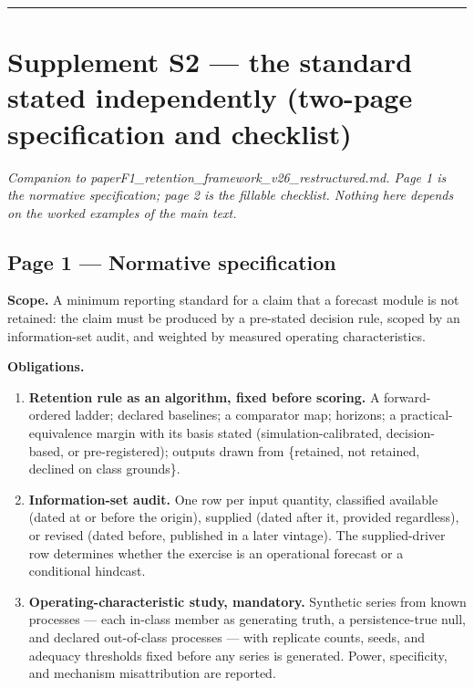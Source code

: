 \documentclass[11pt]{article}
\providecommand{\tightlist}{\setlength{\itemsep}{0.2em}\setlength{\parskip}{0pt}}
\begin{document}
\begin{center}\rule{0.5\linewidth}{0.5pt}\end{center}

\section{Supplement S2 --- the standard stated independently (two-page
specification and
checklist)}\label{supplement-s2-the-standard-stated-independently-two-page-specification-and-checklist}

\emph{Companion to paperF1\_retention\_framework\_v26\_restructured.md.
Page 1 is the normative specification; page 2 is the fillable checklist.
Nothing here depends on the worked examples of the main text.}

\subsection{Page 1 --- Normative
specification}\label{page-1-normative-specification}

\textbf{Scope.} A minimum reporting standard for a claim that a forecast
module is not retained: the claim must be produced by a pre-stated
decision rule, scoped by an information-set audit, and weighted by
measured operating characteristics.

\textbf{Obligations.}

\begin{enumerate}
\def\labelenumi{\arabic{enumi}.}
\tightlist
\item
  \textbf{Retention rule as an algorithm, fixed before scoring.} A
  forward-ordered ladder; declared baselines; a comparator map;
  horizons; a practical-equivalence margin with its basis stated
  (simulation-calibrated, decision-based, or pre-registered); outputs
  drawn from \{retained, not retained, declined on class grounds\}.
\item
  \textbf{Information-set audit.} One row per input quantity, classified
  available (dated at or before the origin), supplied (dated after it,
  provided regardless), or revised (dated before, published in a later
  vintage). The supplied-driver row determines whether the exercise is
  an operational forecast or a conditional hindcast.
\item
  \textbf{Operating-characteristic study, mandatory.} Synthetic series
  from known processes --- each in-class member as generating truth, a
  persistence-true null, and declared out-of-class processes --- with
  replicate counts, seeds, and adequacy thresholds fixed before any
  series is generated. Power, specificity, and mechanism misattribution
  are reported.
\end{enumerate}
\end{document}
